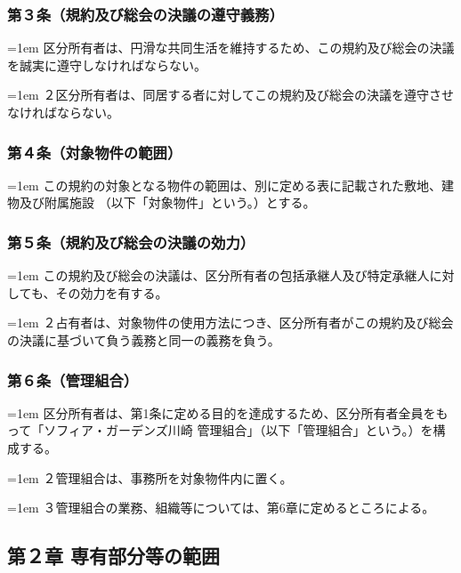 \documentclass[
  luatex,
  paper=a4paper,
  fontsize=11pt,
  jafontsize=11pt,
  jlreq_notes,
]{jlreq}
\newcommand{\joumain}[1]{%
  \noindent\hangindent=1em\hangafter=1
  \hspace{1em}#1%
}
\newcommand{\kou}[2]{%
  \par\noindent\hangindent=1em\hangafter=1
  #1\hspace{1em}#2%
}
\begin{document}
  \subsubsection*{第３条（規約及び総会の決議の遵守義務）}
  \joumain{区分所有者は、円滑な共同生活を維持するため、この規約及び総会の決議を誠実に遵守しなければならない。}
  \kou{２}{区分所有者は、同居する者に対してこの規約及び総会の決議を遵守させなければならない。}

  \subsubsection*{第４条（対象物件の範囲）}
  \joumain{この規約の対象となる物件の範囲は、別に定める表に記載された敷地、建物及び附属施設
  （以下「対象物件」という。）とする。}

  \subsubsection*{第５条（規約及び総会の決議の効力）}
  \joumain{この規約及び総会の決議は、区分所有者の包括承継人及び特定承継人に対しても、その効力を有する。}
  \kou{２}{占有者は、対象物件の使用方法につき、区分所有者がこの規約及び総会の決議に基づいて負う義務と同一の義務を負う。}

  \subsubsection*{第６条（管理組合）}
  \joumain{区分所有者は、第1条に定める目的を達成するため、区分所有者全員をもって「ソフィア・ガーデンズ川崎
  管理組合」（以下「管理組合」という。）を構成する。}
  \kou{２}{管理組合は、事務所を対象物件内に置く。}
  \kou{３}{管理組合の業務、組織等については、第6章に定めるところによる。}

  \begin{center}
    \subsection*{第２章 専有部分等の範囲}
  \end{center}
\end{document}
